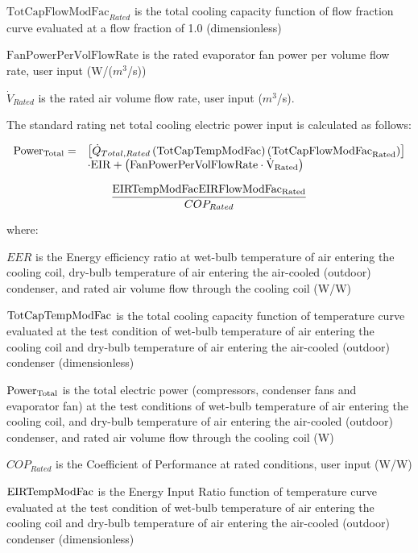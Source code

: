 \(\text{TotCapFlowModFac}_{Rated}\) is the total cooling capacity function of flow fraction curve evaluated at a flow fraction of 1.0 (dimensionless)

\(\text{FanPowerPerVolFlowRate}\) is the rated evaporator fan power per volume flow rate, user input (W/(\(m^3\)/s))

\(\dot{V}_{Rated}\) is the rated air volume flow rate, user input (\(m^3\)/s).

The standard rating net total cooling electric power input is calculated as follows:

\begin{equation}
\begin{array}{rl}
  \rm{Power}_{Total} =& \left[ \dot{Q}_{Total,Rated} \left( \rm{TotCapTempModFac} \right) \left( \rm{TotCapFlowModFac}_{Rated} \right) \right] \\
& \cdot \rm{EIR} + \left( \rm{FanPowerPerVolFlowRate} \cdot \dot{V}_{Rated} \right)
\end{array}
\end{equation}

\begin{equation}
  \frac{\rm{EIRTempModFac} \rm{EIRFlowModFac_{Rated}}}{COP_{Rated}}
\end{equation}

where:

\(EER\) is the Energy efficiency ratio at wet-bulb temperature of air entering the cooling coil, dry-bulb temperature of air entering the air-cooled (outdoor) condenser, and rated air volume flow through the cooling coil (W/W)

\(\rm{TotCapTempModFac}\) is the total cooling capacity function of temperature curve evaluated at the test condition of wet-bulb temperature of air entering the cooling coil and dry-bulb temperature of air entering the air-cooled (outdoor) condenser (dimensionless)

\(\rm{Power}_{Total}\) is the total electric power (compressors, condenser fans and evaporator fan) at the test conditions of wet-bulb temperature of air entering the cooling coil, and dry-bulb temperature of air entering the air-cooled (outdoor) condenser, and rated air volume flow through the cooling coil (W)

\(COP_{Rated}\) is the Coefficient of Performance at rated conditions, user input (W/W)

\(\rm{EIRTempModFac}\) is the Energy Input Ratio function of temperature curve evaluated at the test condition of wet-bulb temperature of air entering the cooling coil and dry-bulb temperature of air entering the air-cooled (outdoor) condenser (dimensionless)

